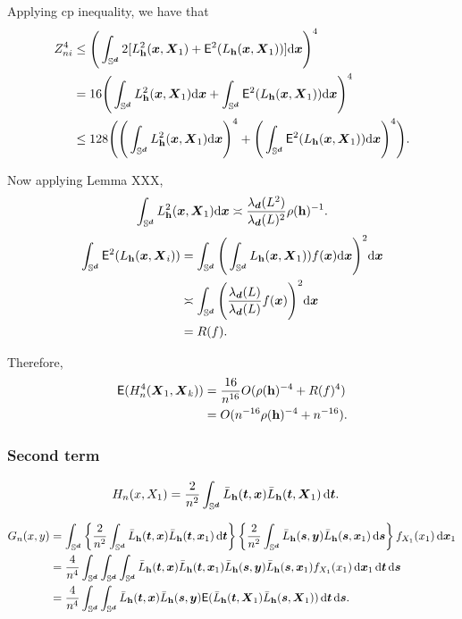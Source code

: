 \documentclass{article}
\begin{document}
Applying cp inequality, we have that
\begin{align*}
    Z_{ni}^4 & \le \Bigg( \int_{\Sr} 2[L_{\bh}^2 (\bx,\bX_1) + \mathsf{E}^2 (L_{\bh} (\bx,\bX_1))] \rd \bx \Bigg)^4 \\
    &= 16 \Bigg( \int_{\Sr} L_{\bh}^2 (\bx,\bX_1) \rd \bx + \int_{\Sr} \mathsf{E}^2 (L_{\bh} (\bx,\bX_1)) \rd \bx \Bigg)^4 \\
    & \le 128 \Bigg( \Bigg( \int_{\Sr} L_{\bh}^2 (\bx,\bX_1) \rd \bx \Bigg)^4 + \Bigg( \int_{\Sr} \mathsf{E}^2 (L_{\bh} (\bx,\bX_1)) \rd \bx \Bigg)^4 \Bigg).
\end{align*}

Now applying Lemma XXX, 
\begin{align*}
    \int_{\Sr} L_{\bh}^2 (\bx,\bX_1) \rd \bx \asymp \frac{\lambda_{\bd}(L^2)}{\lambda_{\bd}(L)^2} \rho(\bh)^{-1}.
\end{align*}
\begin{align*}
    \int_{\Sr} \mathsf{E}^2 (L_{\bh} (\bx,\bX_i)) &= \int_{\Sr} \Bigg( \int_{\Sr} L_{\bh} (\bx,\bX_1)) f(\bx) \rd \bx \Bigg)^2 \rd \bx \\
    & \asymp \int_{\Sr} \Bigg( \frac{\lambda_{\bd}(L)}{\lambda_{\bd}(L)} f(\bx) \Bigg)^2 \rd \bx \\
    &= R(f).
\end{align*}

Therefore,
\begin{align*}
    \mathsf{E} (H_n^4(\bX_1, \bX_k)) &= \frac{16}{n^{16}} O(\rho(\bh)^{-4} + R(f)^4) \\
    &= O(n^{-16} \rho(\bh)^{-4} + n^{-16}).
\end{align*}

\subsubsection{Second term}

\begin{align*}
    H_n(x,X_1) &= \frac{2}{n^2} \int_{\Sr} \bar{L}_{\bh} (\bt,\bx) \bar{L}_{\bh} (\bt,\bX_1) \,\rd \bt.
\end{align*}

\begin{align*}
    G_n(x,y) &= \int_{\Sr} \lrb{\frac{2}{n^2} \int_{\Sr} \bar{L}_{\bh} (\bt,\bx) \bar{L}_{\bh} (\bt,\bx_1) \,\rd \bt} \lrb{\frac{2}{n^2} \int_{\Sr} \bar{L}_{\bh} (\bs,\by) \bar{L}_{\bh} (\bs,\bx_1) \,\rd \bs} f_{X_1}(x_1) \,\rd \bx_1 \\
    &= \frac{4}{n^4} \int_{\Sr} \int_{\Sr} \int_{\Sr} \bar{L}_{\bh} (\bt,\bx) \bar{L}_{\bh} (\bt,\bx_1) \bar{L}_{\bh} (\bs,\by) \bar{L}_{\bh} (\bs,\bx_1) f_{X_1}(x_1) \,\rd \bx_1 \,\rd \bt \,\rd \bs \\
    &= \frac{4}{n^4} \int_{\Sr} \int_{\Sr} \bar{L}_{\bh} (\bt,\bx) \bar{L}_{\bh} (\bs,\by) \mathsf{E} (\bar{L}_{\bh} (\bt,\bX_1) \bar{L}_{\bh} (\bs,\bX_1)) \,\rd \bt \,\rd \bs.
\end{align*}
\end{document}
